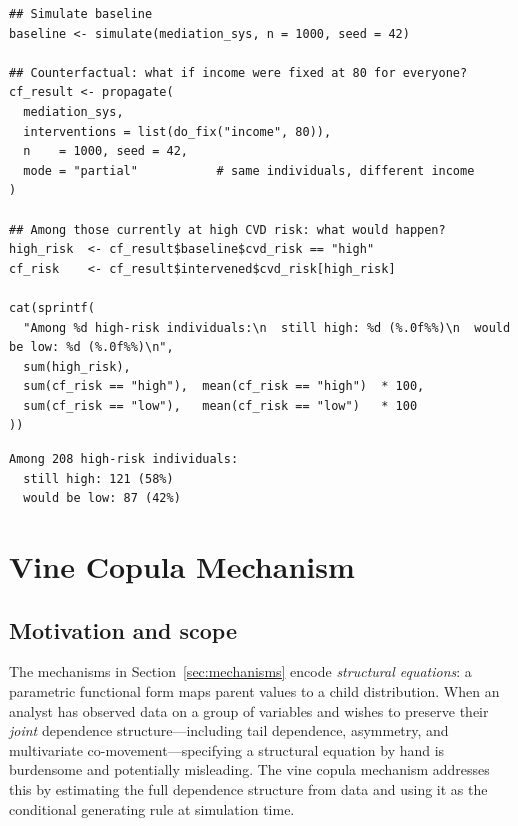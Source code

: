 \documentclass[12pt,a4paper]{article}
\begin{document}
\begin{tcolorbox}[codebox, title={\small\textbf{R} code --- counterfactual query}]
\begin{verbatim}
## Simulate baseline
baseline <- simulate(mediation_sys, n = 1000, seed = 42)

## Counterfactual: what if income were fixed at 80 for everyone?
cf_result <- propagate(
  mediation_sys,
  interventions = list(do_fix("income", 80)),
  n    = 1000, seed = 42,
  mode = "partial"           # same individuals, different income
)

## Among those currently at high CVD risk: what would happen?
high_risk  <- cf_result$baseline$cvd_risk == "high"
cf_risk    <- cf_result$intervened$cvd_risk[high_risk]

cat(sprintf(
  "Among %d high-risk individuals:\n  still high: %d (%.0f%%)\n  would be low: %d (%.0f%%)\n",
  sum(high_risk),
  sum(cf_risk == "high"),  mean(cf_risk == "high")  * 100,
  sum(cf_risk == "low"),   mean(cf_risk == "low")   * 100
))
\end{verbatim}
\end{tcolorbox}

\begin{tcolorbox}[outputbox, title={\small Output}]
\begin{verbatim}
Among 208 high-risk individuals:
  still high: 121 (58%)
  would be low: 87 (42%)
\end{verbatim}
\end{tcolorbox}

\section{Vine Copula Mechanism}
\label{sec:copula}

\subsection{Motivation and scope}
\label{sec:copula_motivation}

The mechanisms in Section~\ref{sec:mechanisms} encode \emph{structural equations}:
a parametric functional form maps parent values to a child distribution. When an
analyst has observed data on a group of variables and wishes to preserve their
\emph{joint} dependence structure---including tail dependence, asymmetry, and
multivariate co-movement---specifying a structural equation by hand is burdensome
and potentially misleading. The vine copula mechanism addresses this by estimating
the full dependence structure from data and using it as the conditional generating
rule at simulation time.
\end{document}
